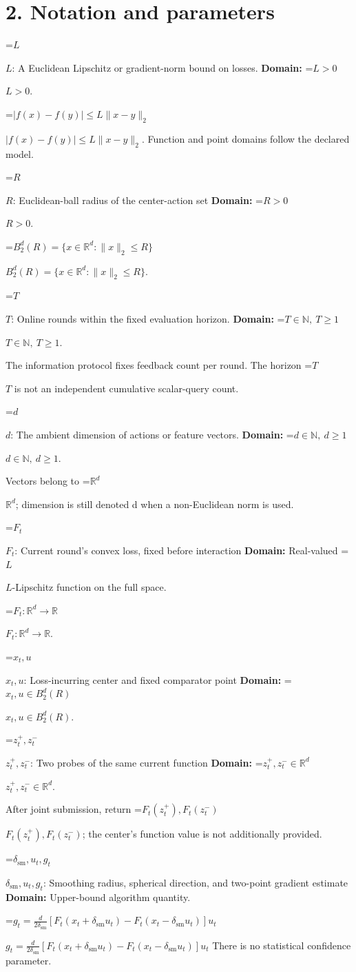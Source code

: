 \documentclass[10pt,a4paper]{article}
\newcommand{\AtlasMath}[1]{\par\begingroup\centering\setbox0=\hbox{$\displaystyle #1$}\ifdim\wd0>1.4\linewidth\typeout{ATLAS WIDE FORMULA: \the\wd0}\fi\ifdim\wd0>\linewidth\resizebox{\linewidth}{!}{\box0}\else\box0\fi\par\endgroup}
\newcommand{\AtlasInlineMath}[1]{\begingroup\setbox0=\hbox{$#1$}\ifdim\wd0>.4\linewidth\endgroup\AtlasMath{#1}\else\endgroup$#1$\fi}
\begin{document}
\section{2. Notation and parameters}
\AtlasInlineMath{L}: A Euclidean Lipschitz or gradient-norm bound on losses. \textbf{Domain:} \AtlasInlineMath{L>0}.

\AtlasInlineMath{|f(x)-f(y)|\le L\|x-y\|_2}. Function and point domains follow the declared model.

\AtlasInlineMath{R}: Euclidean-ball radius of the center-action set \textbf{Domain:} \AtlasInlineMath{R>0}.

\AtlasInlineMath{B_2^d(R)=\{x\in\mathbb R^d:\|x\|_2\le R\}}.

\AtlasInlineMath{T}: Online rounds within the fixed evaluation horizon. \textbf{Domain:} \AtlasInlineMath{T\in\mathbb N,\ T\ge1}.

The information protocol fixes feedback count per round. The horizon \AtlasInlineMath{T} is not an independent cumulative scalar-query count.

\AtlasInlineMath{d}: The ambient dimension of actions or feature vectors. \textbf{Domain:} \AtlasInlineMath{d\in\mathbb N,\ d\ge1}.

Vectors belong to \AtlasInlineMath{\mathbb R^d}; dimension is still denoted d when a non-Euclidean norm is used.

\AtlasInlineMath{F_t}: Current round's convex loss, fixed before interaction \textbf{Domain:} Real-valued \AtlasInlineMath{L}-Lipschitz function on the full space.

\AtlasInlineMath{F_t:\mathbb R^d\to\mathbb R}.

\AtlasInlineMath{x_t,u}: Loss-incurring center and fixed comparator point \textbf{Domain:} \AtlasInlineMath{x_t,u\in B_2^d(R)}.

\AtlasInlineMath{z_t^+,z_t^-}: Two probes of the same current function \textbf{Domain:} \AtlasInlineMath{z_t^+,z_t^-\in\mathbb R^d}.

After joint submission, return \AtlasInlineMath{F_t(z_t^+),F_t(z_t^-)}; the center's function value is not additionally provided.

\AtlasInlineMath{\delta_{\mathrm{sm}},u_t,g_t}: Smoothing radius, spherical direction, and two-point gradient estimate \textbf{Domain:} Upper-bound algorithm quantity.

\AtlasInlineMath{g_t=\frac d{2\delta_{\mathrm{sm}}}[F_t(x_t+\delta_{\mathrm{sm}}u_t)-F_t(x_t-\delta_{\mathrm{sm}}u_t)]u_t} There is no statistical confidence parameter.
\end{document}

